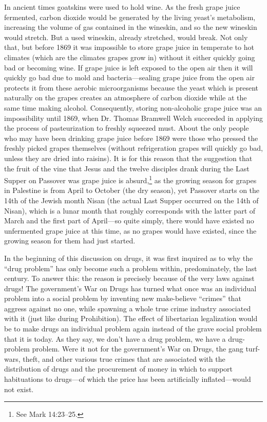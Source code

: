 \documentclass[letterpaper,12pt]{article}
\begin{document}
In ancient times goatskins were used to hold wine. As the fresh grape juice fermented, carbon dioxide would be generated by the living yeast's metabolism, increasing the volume of gas contained in the wineskin, and so the new wineskin would stretch. But a used wineskin, already stretched, would break. Not only that, but before 1869 it was impossible to store grape juice in temperate to hot climates (which are the climates grapes grow in) without it either quickly going bad or becoming wine. If grape juice is left exposed to the open air then it will quickly go bad due to mold and bacteria---sealing grape juice from the open air protects it from these aerobic microorganisms because the yeast which is present naturally on the grapes creates an atmosphere of carbon dioxide while at the same time making alcohol. Consequently, storing non-alcoholic grape juice was an impossibility until 1869, when Dr. Thomas Bramwell Welch succeeded in applying the process of pasteurization to freshly squeezed must. About the only people who may have been drinking grape juice before 1869 were those who pressed the freshly picked grapes themselves (without refrigeration grapes will quickly go bad, unless they are dried into raisins). It is for this reason that the suggestion that the fruit of the vine that Jesus and the twelve disciples drank during the Last Supper on Passover was grape juice is absurd,\footnote{See Mark 14:23--25.} as the growing season for grapes in Palestine is from April to October (the dry season), yet Passover starts on the 14th of the Jewish month Nisan (the actual Last Supper occurred on the 14th of Nisan), which is a lunar month that roughly corresponds with the latter part of March and the first part of April---so quite simply, there would have existed no unfermented grape juice at this time, as no grapes would have existed, since the growing season for them had just started.

In the beginning of this discussion on drugs, it was first inquired as to why the ``drug problem'' has only become such a problem within, predominately, the last century. To answer this: the reason is precisely because of the very laws against drugs! The government's War on Drugs has turned what once was an individual problem into a social problem by inventing new make-believe ``crimes'' that aggress against no one, while spawning a whole true crime industry associated with it (just like during Prohibition). The effect of libertarian legalization would be to make drugs an individual problem again instead of the grave social problem that it is today. As they say, we don't have a drug problem, we have a drug-problem problem. Were it not for the government's War on Drugs, the gang turf-wars, theft, and other various true crimes that are associated with the distribution of drugs and the procurement of money in which to support habituations to drugs---of which the price has been artificially inflated---would not exist.
\end{document}
